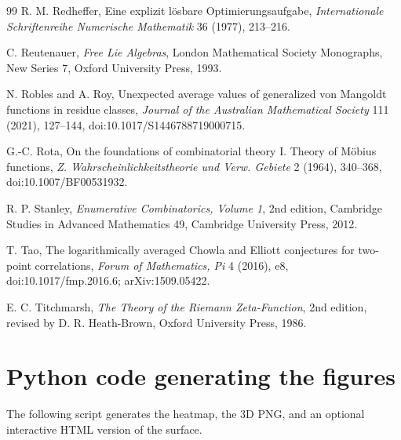 \documentclass[11pt]{amsart}
\numberwithin{equation}{section}
\theoremstyle{plain}
\theoremstyle{definition}
\theoremstyle{remark}
\begin{document}
\begin{thebibliography}{99}
R. M. Redheffer,
Eine explizit l\"osbare Optimierungsaufgabe,
\emph{Internationale Schriftenreihe Numerische Mathematik} 36 (1977), 213--216.

C. Reutenauer,
\emph{Free Lie Algebras},
London Mathematical Society Monographs, New Series 7, Oxford University Press, 1993.

N. Robles and A. Roy,
Unexpected average values of generalized von Mangoldt functions in residue classes,
\emph{Journal of the Australian Mathematical Society} 111 (2021), 127--144,
doi:10.1017/S1446788719000715.

G.-C. Rota,
On the foundations of combinatorial theory I. Theory of M\"obius functions,
\emph{Z. Wahrscheinlichkeitstheorie und Verw. Gebiete} 2 (1964), 340--368,
doi:10.1007/BF00531932.

R. P. Stanley,
\emph{Enumerative Combinatorics, Volume 1},
2nd edition, Cambridge Studies in Advanced Mathematics 49, Cambridge University Press, 2012.

T. Tao,
The logarithmically averaged Chowla and Elliott conjectures for two-point correlations,
\emph{Forum of Mathematics, Pi} 4 (2016), e8,
doi:10.1017/fmp.2016.6; arXiv:1509.05422.

E. C. Titchmarsh,
\emph{The Theory of the Riemann Zeta-Function},
2nd edition, revised by D. R. Heath-Brown, Oxford University Press, 1986.

\end{thebibliography}

\appendix

\section{Python code generating the figures}
\label{app:python_code}

The following script generates the heatmap, the 3D PNG, and an optional interactive HTML version of the surface.


\end{document}

